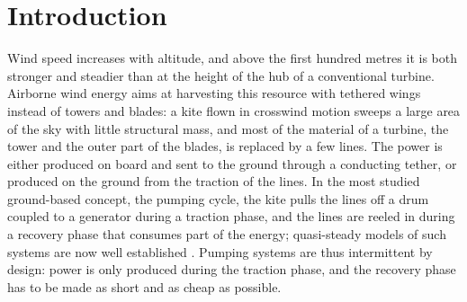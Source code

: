 \section*{Introduction} \label{sec:intro}

Wind speed increases with altitude, and above the first hundred metres it is both stronger and steadier than at the height of the hub of a conventional turbine.
Airborne wind energy aims at harvesting this resource with tethered wings instead of towers and blades: a kite flown in crosswind motion sweeps a large area of the sky with little structural mass, and most of the material of a turbine, the tower and the outer part of the blades, is replaced by a few lines.
The power is either produced on board and sent to the ground through a conducting tether, or produced on the ground from the traction of the lines.
In the most studied ground-based concept, the pumping cycle, the kite pulls the lines off a drum coupled to a generator during a traction phase, and the lines are reeled in during a recovery phase that consumes part of the energy; quasi-steady models of such systems are now well established \cite{vanderVlugt2019RE}.
Pumping systems are thus intermittent by design: power is only produced during the traction phase, and the recovery phase has to be made as short and as cheap as possible.

